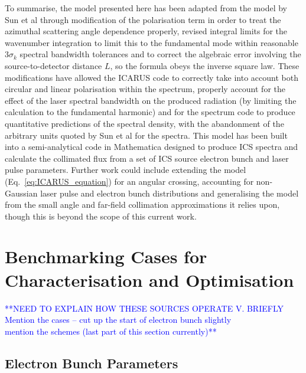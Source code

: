 \documentclass[../main.tex]{subfiles}
\begin{document}
To summarise, the model presented here has been adapted from the model by Sun et al \cite{sun2009characterizations,sun2011theoretical} through modification of the polarisation term in order to treat the azimuthal scattering angle dependence properly, revised integral limits for the wavenumber integration to limit this to the fundamental mode within reasonable $3\sigma_{k}$ spectral bandwidth tolerances and to correct the algebraic error involving the source-to-detector distance $L$, so the formula obeys the inverse square law. These modifications have allowed the \textsc{ICARUS} code to correctly take into account both circular and linear polarisation within the spectrum, properly account for the effect of the laser spectral bandwidth on the produced radiation (by limiting the calculation to the fundamental harmonic) and for the spectrum code to produce quantitative predictions of the spectral density, with the abandonment of the arbitrary units quoted by Sun et al \cite{sun2009characterizations,sun2011theoretical} for the spectra. This model has been built into a semi-analytical code in Mathematica designed to produce ICS spectra and calculate the collimated flux from a set of ICS source electron bunch and laser pulse parameters. Further work could include extending the model (Eq.~\ref{eq:ICARUS_equation}) for an angular crossing, accounting for non-Gaussian laser pulse and electron bunch distributions and generalising the model from the small angle and far-field collimation approximations it relies upon, though this is beyond the scope of this current work.

\section{Benchmarking Cases for Characterisation and Optimisation}
\label{sec:benchmarking_cases_characterisation_optimisation}

\textcolor{blue}{**NEED TO EXPLAIN HOW THESE SOURCES OPERATE V. BRIEFLY \\ Mention the cases -- cut up the start of electron bunch slightly \\ mention the schemes (last part of this section currently)**}

\subsection{Electron Bunch Parameters}
\end{document}
